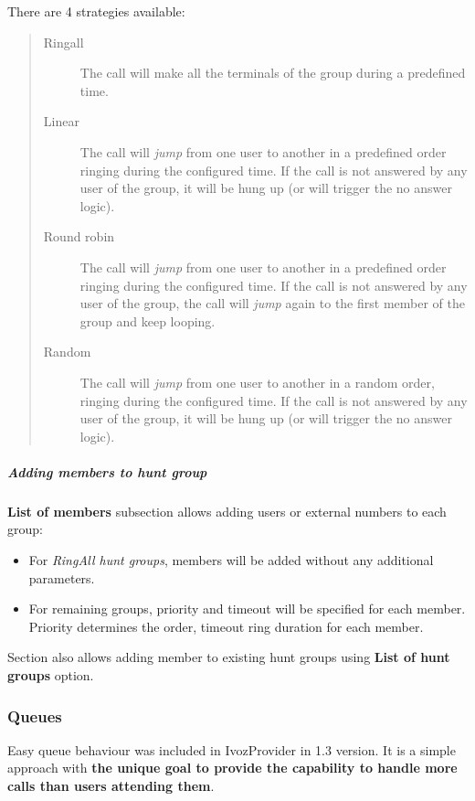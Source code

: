 \documentclass[letterpaper,10pt,spanish]{sphinxmanual}
\begin{document}
There are 4 strategies available:
\begin{quote}
\begin{description}
\item[{Ringall}] \leavevmode
The call will make all the terminals of the group during a predefined
time.

\item[{Linear}] \leavevmode
The call will \emph{jump} from one user to another in a predefined order
ringing during the configured time. If the call is not answered by any
user of the group, it will be hung up (or will trigger the no answer logic).

\item[{Round robin}] \leavevmode
The call will \emph{jump} from one user to another in a predefined order
ringing during the configured time. If the call is not answered by any
user of the group, the call will \emph{jump} again to the first member of the
group and keep looping.

\item[{Random}] \leavevmode
The call will \emph{jump} from one user to another in a random order,
ringing during the configured time.  If the call is not answered by any
user of the group, it will be hung up (or will trigger the no answer logic).

\end{description}
\end{quote}


\subparagraph{Adding members to hunt group}
\label{administration_portal/client/vpbx/routing_endpoints/hunt_groups:adding-members-to-hunt-group}
\textbf{List of members} subsection allows adding users or external numbers to each group:
\begin{itemize}
\item {} 
For \emph{RingAll hunt groups}, members will be added without any additional parameters.

\item {} 
For remaining groups, priority and timeout will be specified for each member. Priority determines the order, timeout ring
duration for each member.

\end{itemize}

Section {\hyperref[administration_portal/client/vpbx/users:users]{}} also allows adding member to existing hunt groups using \textbf{List of hunt groups} option.


\subsubsection{Queues}
\label{administration_portal/client/vpbx/routing_endpoints/queues:queues}\label{administration_portal/client/vpbx/routing_endpoints/queues::doc}\label{administration_portal/client/vpbx/routing_endpoints/queues:id1}
Easy queue behaviour was included in IvozProvider in 1.3 version. It is a simple
approach with \textbf{the unique goal to provide the capability to handle more calls
than users attending them}.
\end{document}

